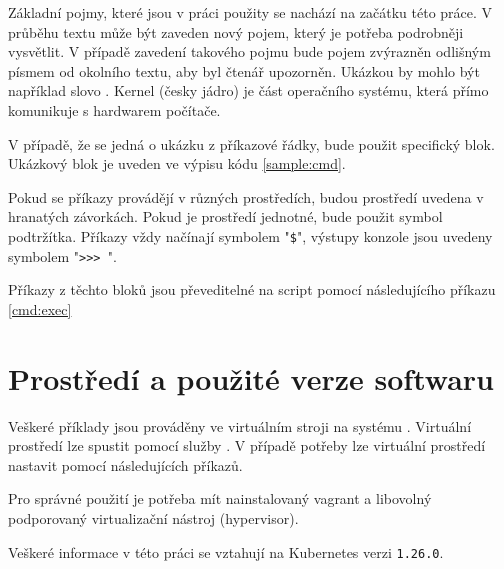 Základní pojmy, které jsou v práci použity se nachází na začátku této práce. V průběhu textu může být zaveden nový pojem, který je potřeba podrobněji vysvětlit. V případě zavedení takového pojmu bude pojem zvýrazněn odlišným písmem od okolního textu, aby byl čtenář upozorněn. Ukázkou by mohlo být například slovo . Kernel (česky jádro) je část operačního systému, která přímo komunikuje s hardwarem počítače.  

V případě, že se jedná o ukázku z příkazové řádky, bude použit specifický blok. Ukázkový blok je uveden ve výpisu kódu \ref{sample:cmd}.

Pokud se příkazy provádějí v různých prostředích, budou prostředí uvedena v hranatých závorkách. Pokud je prostředí jednotné, bude použit symbol podtržítka. Příkazy vždy načínají symbolem "\verb|$|", výstupy konzole jsou uvedeny symbolem "\verb|>>> |".


Příkazy z těchto bloků jsou převeditelné na script pomocí následujícího příkazu \ref{cmd:exec} 


\section{Prostředí a použité verze softwaru}
Veškeré příklady jsou prováděny ve virtuálním stroji na systému . Virtuální prostředí lze spustit pomocí služby . V případě potřeby lze virtuální prostředí nastavit pomocí následujících příkazů.


Pro správné použití je potřeba mít nainstalovaný vagrant a libovolný podporovaný virtualizační nástroj (hypervisor).

Veškeré informace v této práci se vztahují na Kubernetes verzi \verb|1.26.0|.